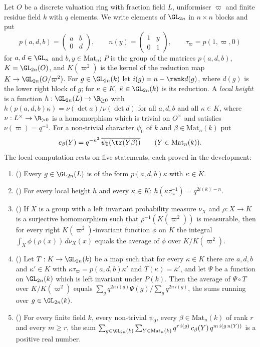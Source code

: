 Let $O$ be a discrete valuation ring with fraction field $L$, uniformiser $\varpi$ and finite residue field $k$ with $q$ elements. We
write elements of $\GL_{2n}$ in $n\times n$ blocks and put
\[
p(a,d,b)=\begin{pmatrix}a&b\\0&d\end{pmatrix},\qquad n(y)=\begin{pmatrix}1&y\\0&1\end{pmatrix},\qquad \tau_\varpi=p(1,\varpi,0)
\]
for $a,d\in\GL_n$ and $b,y\in\mathrm{Mat}_n$; $P$ is the group of the matrices $p(a,d,b)$, $K=\GL_{2n}(O)$, and $K(\varpi^2)$ is the kernel of
the reduction map $K\to\GL_{2n}(O/\varpi^2)$. For $g\in\GL_{2n}(k)$ let $i(g)=n-\rank d(g)$, where $d(g)$ is the lower right block of $g$; for
$\kappa\in K$, $\bar\kappa\in\GL_{2n}(k)$ is its reduction. A \emph{local height} is a function $h:\GL_{2n}(L)\to\R_{\ge0}$ with
$h(p(a,d,b)\kappa)=\nu(\det a)/\nu(\det d)$ for all $a,d,b$ and all $\kappa\in K$, where $\nu:L^\times\to\R_{>0}$ is a homomorphism which is
trivial on $O^\times$ and satisfies $\nu(\varpi)=q^{-1}$. For a non-trivial character $\psi_0$ of $k$ and $\beta\in\mathrm{Mat}_n(k)$ put
\[
c_\beta(Y)=q^{-n^2}\,\overline{\psi_0(\tr(Y\beta))}\qquad(Y\in\mathrm{Mat}_n(k)).
\]
The local computation rests on five statements, each proved in the development:
\begin{enumerate}[label=(J\arabic*)]
\item\label{pf:liftinj:J1} () Every $g\in\GL_{2n}(L)$ is of the form $p(a,d,b)\kappa$
with $\kappa\in K$.
\item\label{pf:liftinj:J2} () For every local height $h$ and every $\kappa\in K$:
$h(\kappa\tau_\varpi^{-1})=q^{2i(\bar\kappa)-n}$.
\item\label{pf:liftinj:J3} () If $X$ is a group with a left invariant probability measure
$\nu_X$ and $\rho:X\to K$ is a surjective homomorphism such that $\rho^{-1}(K(\varpi^2))$ is measurable, then for every right
$K(\varpi^2)$-invariant function $\phi$ on $K$ the integral $\int_X\phi(\rho(x))\,d\nu_X(x)$ equals the average of $\phi$ over $K/K(\varpi^2)$.
\item\label{pf:liftinj:J4} () Let $T:K\to\GL_{2n}(k)$ be a map such that for every $\kappa\in K$ there
are $a,d,b$ and $\kappa'\in K$ with $\kappa\tau_\varpi=p(a,d,b)\kappa'$ and $T(\kappa)=\bar\kappa'$, and let $\Psi$ be a function on $\GL_{2n}(k)$ which
is left invariant under $P(k)$. Then the average of $\Psi\circ T$ over $K/K(\varpi^2)$ equals
$\sum_gq^{2n\,i(g)}\Psi(g)\big/\sum_gq^{2n\,i(g)}$, the sums running over $g\in\GL_{2n}(k)$.
\item\label{pf:liftinj:J5} () For every finite field $k$, every non-trivial $\psi_0$, every
$\beta\in\mathrm{Mat}_n(k)$ of rank $r$ and every $m\ge r$, the sum
$\sum_{g\in\GL_{2n}(k)}\sum_{Y\in\mathrm{Mat}_n(k)}q^{r\,i(g)}\,c_\beta(Y)\,q^{m\,i(g\,n(Y))}$ is a positive real number.
\end{enumerate}

